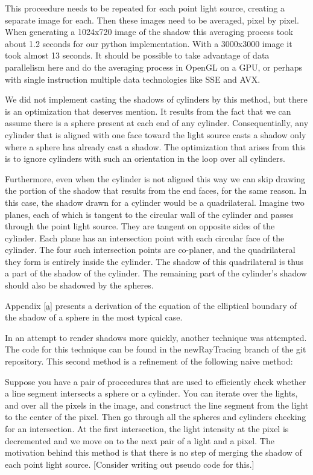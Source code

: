 \documentclass[10pt]{article}
\begin{document}
This proceedure needs to be repeated for each point light source, creating a separate image for each. Then these images need to be averaged, pixel by pixel. When generating a 1024x720 image of the shadow this averaging process took about 1.2 seconds for our python implementation. With a 3000x3000 image it took almost 13 seconds. It should be possible to take advantage of data parallelism here and do the averaging process in OpenGL on a GPU, or perhaps with single instruction multiple data technologies like SSE and AVX.

We did not implement casting the shadows of cylinders by this method, but there is an optimization that deserves mention. It results from the fact that we can assume there is a sphere present at each end of any cylinder. Consequentially, any cylinder that is aligned with one face toward the light source casts a shadow only where a sphere has already cast a shadow. The optimization that arises from this is to ignore cylinders with such an orientation in the loop over all cylinders.

Furthermore, even when the cylinder is not aligned this way we can skip drawing the portion of the shadow that results from the end faces, for the same reason. In this case, the shadow drawn for a cylinder would be a quadrilateral. Imagine two planes, each of which is tangent to the circular wall of the cylinder and passes through the point light source. They are tangent on opposite sides of the cylinder. Each plane has an intersection point with each circular face of the cylinder. The four such intersection points are co-planer, and the quadrilateral they form is entirely inside the cylinder. The shadow of this quadrilateral is thus a part of the shadow of the cylinder. The remaining part of the cylinder's shadow should also be shadowed by the spheres.

Appendix \ref{a} presents a derivation of the equation of the elliptical boundary of the shadow of a sphere in the most typical case.

In an attempt to render shadows more quickly, another technique was attempted. The code for this technique can be found in the newRayTracing branch of the git repository. This second method is a refinement of the following naive method:

Suppose you have a pair of proceedures that are used to efficiently check whether a line segment intersects a sphere or a cylinder. You can iterate over the lights, and over all the pixels in the image, and construct the line segment from the light to the center of the pixel. Then go through all the spheres and cylinders checking for an intersection. At the first intersection, the light intensity at the pixel is decremented and we move on to the next pair of a light and a pixel. The motivation behind this method is that there is no step of merging the shadow of each point light source. [Consider writing out pseudo code for this.]
\end{document}
